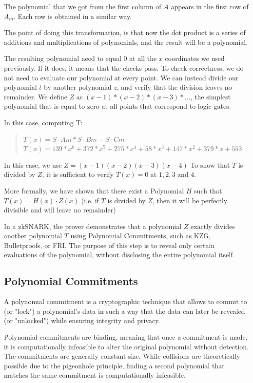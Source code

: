 The polynomial that we got from the first column of $A$ appears in the first row of $A_m$. Each row is obtained in a similar way.

The point of doing this transformation, is that now the dot product is a series of additions and multiplications of polynomials, and the result will be a polynomial.

The resulting polynomial need to equal $0$ at all the $x$ coordinates we used previously.
If it does, it means that the checks pass.
To check correctness, we do not need to evaluate our polynomial at every point. 
We can instead divide our polynomial $t$ by another polynomial $z$, and verify that the division leaves no remainder.
We define $Z$ as $(x - 1) * (x - 2) * (x - 3) * ...$, the simplest polynomial that is equal to zero at all points that correspond to logic gates. 

In this case, computing T:
\begin{quote}
$T(x) = S \cdot Am * S \cdot Bm - S \cdot Cm  $
$T(x) = 139*x^6 + 372*x^5 + 275*x^4 + 58*x^3 + 147*x^2 + 379*x + 553$
\end{quote}

In this case, we use $Z = (x-1)(x-2)(x-3)(x-4)$
To show that $T$ is divided by $Z$, it is sufficient to verify $T(x) = 0$ at $1,2,3$ and $4$.

More formally, we have shown that there exist a Polynomial $H$ such that $T(x)=H(x) \cdot Z(x)$
(i.e. if $T$ is divided by $Z$, then it will be perfectly divisible and will leave no remainder)

In a zkSNARK, the prover demonstrates that a polynomial $Z$ exactly divides another polynomial
$T$ using Polynomial Commitments, such as KZG, Bulletproofs, or FRI. 
The purpose of this step is to reveal only certain evaluations of the polynomial, without disclosing the entire polynomial itself.\cite{VB16}


\subsection{Polynomial Commitments}
\label{subsec:pc}
A polynomial commitment is a cryptographic technique that allows to commit to (or "lock") a polynomial's data 
in such a way that the data can later be revealed (or "unlocked") while ensuring integrity and privacy.

Polynomial commitments are binding, meaning that once a commitment is made, it is computationally infeasible to alter the original polynomial without detection. 
The commitments are generally constant size. While collisions are theoretically possible due to the pigeonhole principle, finding a second polynomial that matches the same commitment is computationally infeasible.

